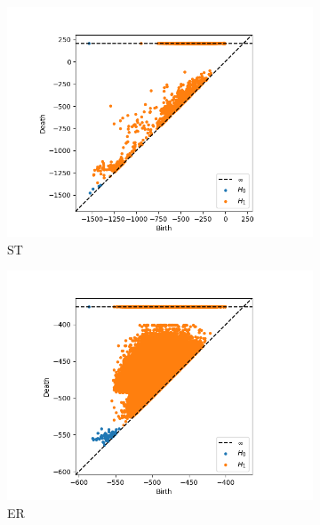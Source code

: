 \documentclass[oneside,a4paper,12pt, DIV=calc]{scrbook}
\theoremstyle{definition}
\begin{document}
\begin{figure}[ht]
  \centering

  \begin{subfigure}{.49 \linewidth}
    \includegraphics[scale=0.49]{./graph_phs/ST.png}
    \caption{ST}
  \end{subfigure}%
  \begin{subfigure}{.49 \linewidth}
    \includegraphics[scale=0.49]{./graph_phs/ER.png}
    \caption{ER}
  \end{subfigure}
  \begin{subfigure}{.49 \linewidth}

\end{subfigure}
\end{figure}
\end{document}
